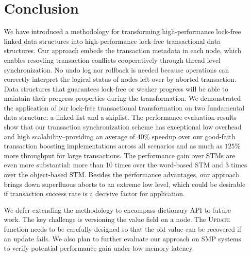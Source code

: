 \documentclass[10pt,conference,compsocconf]{IEEEtran}
\begin{document}
\section{Conclusion}
\label{sec:conclusion}
We have introduced a methodology for transforming high-performance lock-free linked data structures into high-performance lock-free transactional data structures. 
Our approach embeds the transaction metadata in each node, which enables resovling transaction conflicts cooperatively through thread level synchronization.
No undo log nor rollback is needed because operations can correctly interpret the logical status of nodes left over by aborted transaction.
Data structures that guarantees lock-free or weaker progress will be able to maintain their progress properties during the transformation.
We demonstrated the application of our lock-free transactional transformation on two fundamental data structure: a linked list and a skiplist.  
The performance evaluation results show that our transaction synchronization scheme has exceptional low overhead and high scalability--providing an average of $40\%$ speedup over our good-faith transaction boosting implementations across all scenarios and as much as $125\%$ more throughput for large transactions.
The performance gain over STMs are even more substantial: more than 10 times over the word-based STM and 3 times over the object-based STM.
Besides the performance advantages, our approach brings down superfluous aborts to an extreme low level, which could be desirable if transaction success rate is a decisive factor for application.

We defer extending the methodology to encompass dictionary API to future work.
The key challenge is versioning the value field on a node.
The \textsc{Update} function needs to be carefully designed so that the old value can be recovered if an update fails.
We also plan to further evaluate our approach on SMP systems to verify potential performance gain under low memory latency.



\end{document}
